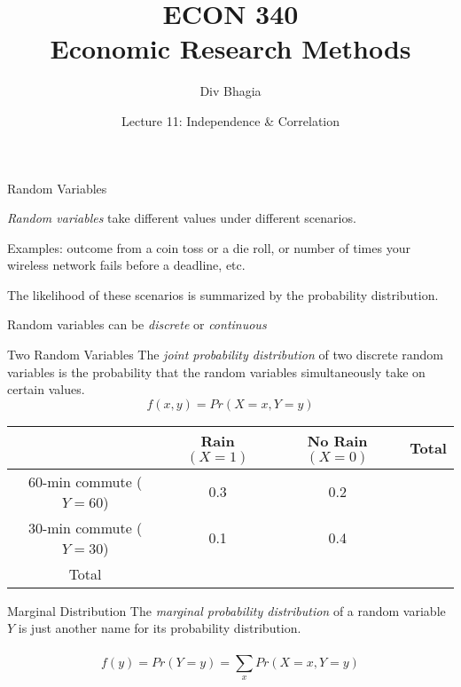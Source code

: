 \documentclass{./../div_teaching_slides}
\begin{document}
\title{ECON 340 \\ Economic Research Methods}
\author{Div Bhagia}
\date{Lecture 11: Independence \& Correlation}

\begin{frame}
\maketitle
\end{frame}

\begin{frame}{Random Variables}
\begin{witemize}
  \item \textit{Random variables} take different values under different scenarios.
  \item Examples:  outcome from a coin toss or a die roll, or number of times your wireless network fails before a deadline, etc.
  \item The likelihood of these scenarios is summarized by the probability distribution.
  \item Random variables can be \textit{discrete} or \textit{continuous}
\end{witemize}
\end{frame}


\begin{frame}{Two Random Variables}
  The \textit{joint probability distribution} of two discrete random variables is the probability that the random variables simultaneously take on certain
values.
$$ f(x,y) = Pr(X=x, Y=y)  $$
\vspace{0.25em}

\centering \small
\begin{tabularx}{0.95\textwidth}{cccc}
\toprule
	& Rain $(X=1)$ & No Rain $(X=0)$ & Total \\
	\midrule
60-min commute ($Y=60$) & 0.3  & 0.2 \\ 
30-min commute ($Y=30$) & 0.1 & 0.4 \\
\midrule
 Total & &  & \\
 \bottomrule
\end{tabularx}
\end{frame}

\begin{frame}{Marginal Distribution}
The \textit{marginal probability distribution} of a random variable $Y$ is just another name for its probability distribution. \\~\\
$$ f(y) = Pr(Y=y) = \sum_{x} Pr(X=x, Y=y) $$
\end{frame}
\end{document}
